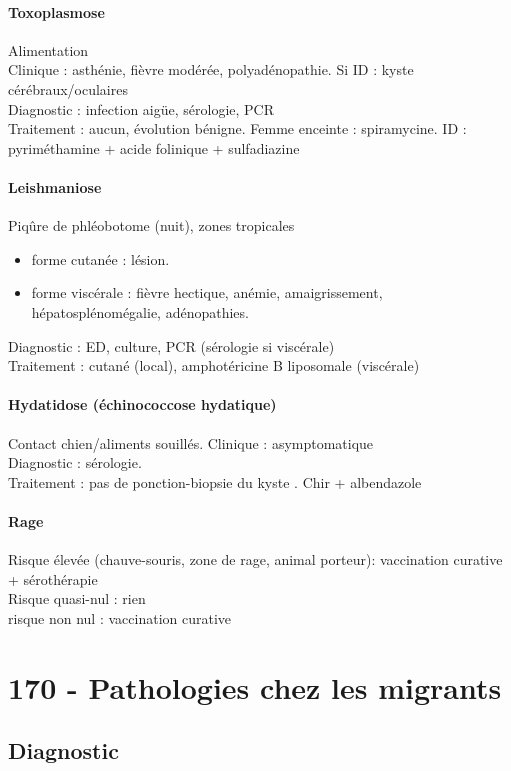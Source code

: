 \paragraph{Toxoplasmose} Alimentation\\
Clinique : asthénie, fièvre modérée, polyadénopathie. Si ID : kyste
cérébraux/oculaires\\
Diagnostic : infection aigüe, sérologie, PCR\\
Traitement : aucun, évolution bénigne. Femme enceinte : spiramycine. ID :
pyriméthamine + acide folinique + sulfadiazine

\paragraph{Leishmaniose} Piqûre de phléobotome (nuit), zones tropicales
\begin{itemize}
  \item forme cutanée : lésion. 
  \item forme viscérale : fièvre hectique, anémie, amaigrissement,
    hépatosplénomégalie, adénopathies.
\end{itemize}
Diagnostic : ED, culture, PCR (sérologie si viscérale)\\
Traitement : cutané (local), amphotéricine B liposomale (viscérale)

\paragraph{Hydatidose (échinococcose hydatique)} Contact chien/aliments
souillés.
Clinique : asymptomatique\\
Diagnostic : sérologie.\\
Traitement : pas de ponction-biopsie du kyste \danger. Chir + albendazole

\paragraph{Rage} 
Risque élevée (chauve-souris, zone de rage, animal porteur): vaccination
curative + sérothérapie\\
Risque quasi-nul : rien\\
risque non nul : vaccination curative
 
\section{170 - Pathologies chez les migrants}%
\label{sec:ue_6_170_pathologies_chez_les_migrants}
\subsection{Diagnostic}

